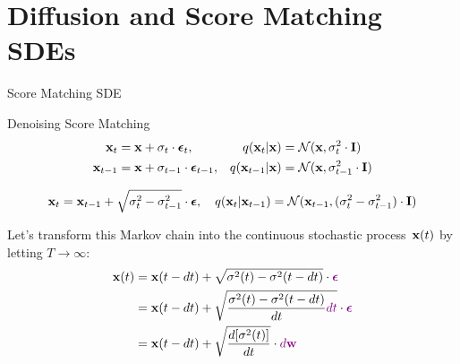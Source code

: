 \documentclass{beamer}
\renewcommand{\eqpause}{}
\renewcommand{\nextonslide}[1]{#1}
\begin{document}
\section{Diffusion and Score Matching SDEs}
\begin{frame}{Score Matching SDE}
	\vspace{-0.3cm}
	\begin{block}{Denoising Score Matching}
		\vspace{-0.7cm}
		\begin{align*}
			\mathbf{x}_t &= \mathbf{x} + \sigma_t \cdot \boldsymbol{\epsilon}_t, & q(\mathbf{x}_t | \mathbf{x}) &= \mathcal{N}(\mathbf{x}, \sigma_t^2 \cdot \mathbf{I}) \\
			\mathbf{x}_{t-1} &= \mathbf{x} + \sigma_{t-1} \cdot \boldsymbol{\epsilon}_{t-1}, & q(\mathbf{x}_{t-1} | \mathbf{x}) &= \mathcal{N}(\mathbf{x}, \sigma_{t-1}^2 \cdot \mathbf{I})
		\end{align*}
	\end{block}
	\eqpause
	\vspace{-1.0cm}
	\[
		\mathbf{x}_t = \mathbf{x}_{t - 1} + \sqrt{\sigma^2_t - \sigma^2_{t-1}} \cdot \boldsymbol{\epsilon}, \quad q(\mathbf{x}_{t} | \mathbf{x}_{t-1}) = \mathcal{N}(\mathbf{x}_{t-1}, (\sigma_t^2 - \sigma_{t-1}^2) \cdot \mathbf{I})
	\]
	\eqpause
	Let's transform this Markov chain into the continuous stochastic process~$\mathbf{x}(t)$ by letting $T \rightarrow \infty$:
	\vspace{-0.3cm}
	\begin{align*}
		\bx(t) &= \bx(t - dt) + \sqrt{\sigma^2(t) - \sigma^2(t - dt)} \cdot {\color{violet}\bepsilon}
		\nextonslide{\\ &= \bx(t - dt) + \sqrt{\frac{\sigma^2(t) - \sigma^2(t - dt)}{dt} {\color{violet}dt}} \cdot {\color{violet}\bepsilon}}
		 \nextonslide{\\ &= \bx(t - dt) + \sqrt{\frac{ d [\sigma^2(t)]}{dt}} \cdot {\color{violet}d \bw}}
	\end{align*}
	\vspace{-0.5cm}
\end{frame}
\end{document}
